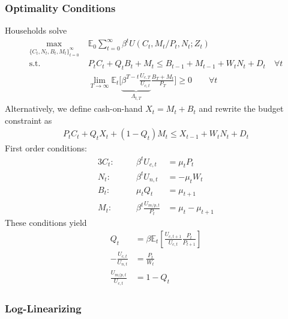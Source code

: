\documentclass[12pt]{article}
\theoremstyle{plain}
\theoremstyle{definition}
\theoremstyle{remark}
\newcommand{\limT}{\lim_{T\rightarrow\infty}}
\newcommand{\E}{\mathbb{E}}
\newcommand{\sumtinfz}{\sum^\infty_{t=0}}
\newcommand{\tinfz}{^\infty_{t=0}}
\begin{document}
\subsubsection{Optimality Conditions}
Households solve
\begin{align*}
  \max_{\{C_t,N_t,B_t,M_t\}\tinfz} \;
  &\E_0\sumtinfz \beta^t U(C_t,M_t/P_t,N_t;Z_t) \\
  \text{s.t.}\quad&
  P_tC_t + Q_{t}B_t + M_t
  \leq B_{t-1} + M_{t-1} + W_tN_t + D_t\quad \forall t\\
  &\limT \E_t\bigg[
    \underbrace{\beta^{T-t} \frac{U_{c,T}}{U_{c,t}}}_{\Lambda_{t,T}}
    \frac{B_T+M_t}{P_T}
  \bigg]
  \geq 0
  \qquad \forall t
\end{align*}
Alternatively, we define cash-on-hand $X_t=M_t+B_t$ and rewrite the
budget constraint as
\begin{align*}
  P_tC_t
  + Q_{t}X_t
  + (1-Q_{t})M_t
  \leq X_{t-1} + W_tN_t + D_t
\end{align*}
First order conditions:
\begin{alignat*}{3}
  C_t:&&\quad
  \beta^t U_{c,t} &= \mu_t P_t \\
  N_t:&&\quad
  \beta^t U_{n,t} &= -\mu_t W_t \\
  B_t:&&\quad
  \mu_t Q_t &= \mu_{t+1} \\
  M_t:&&\quad
  \beta^t \frac{U_{m/p,t}}{P_t}
  &=
  \mu_t - \mu_{t+1}
\end{alignat*}
These conditions yield
\begin{align*}
  Q_t &= \beta \E_t\left[
    \frac{U_{c,t+1}}{U_{c,t}}\frac{P_t}{P_{t+1}}
  \right]
  \\
  -\frac{U_{c,t}}{U_{n,t}} &= \frac{P_t}{W_t}
  \\
  \frac{U_{m/p,t}}{U_{c,t}}
  &=
  1 - Q_t
\end{align*}

\clearpage
\subsubsection{Log-Linearizing}
\end{document}
